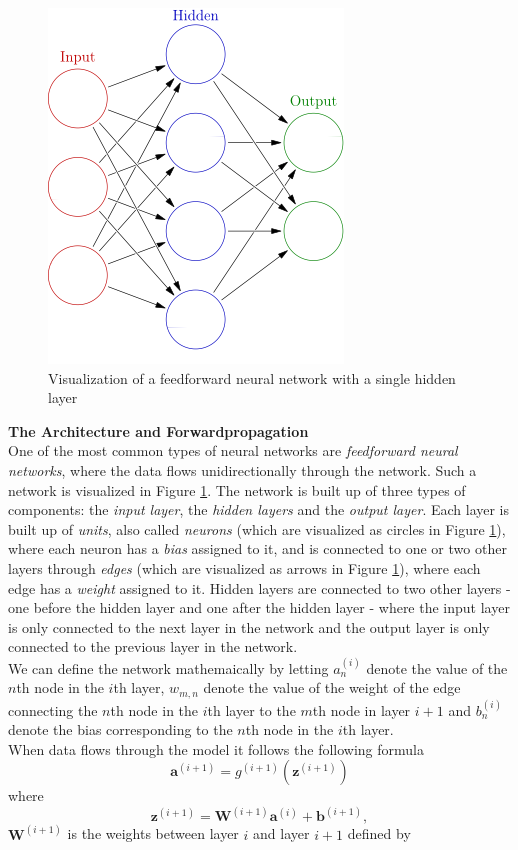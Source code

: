 \documentclass[./main.tex]{subfiles}
\begin{document}
\begin{figure}[H]
    \centering
    \includegraphics[height = 5 cm]{entities/feed_forward_nn.jpg}
    \caption{Visualization of a feedforward neural network with a single hidden layer \cite{feedforward_nn}}
    \label{feedforward_nn}
\end{figure}
\noindent \textbf{The Architecture and Forwardpropagation} \\
One of the most common types of neural networks are \textit{feedforward neural networks}, where the data flows unidirectionally through the network. Such a network is visualized in Figure \ref{feedforward_nn}. The network is built up of three types of components: the \textit{input layer}, the \textit{hidden layers} and the \textit{output layer}. Each layer is built up of \textit{units}, also called \textit{neurons} (which are visualized as circles in Figure \ref{feedforward_nn}), where each neuron has a \textit{bias} assigned to it, and is connected to one or two other layers through \textit{edges} (which are visualized as arrows in Figure \ref{feedforward_nn}), where each edge has a \textit{weight} assigned to it. Hidden layers are connected to two other layers - one before the hidden layer and one after the hidden layer - where the input layer is only connected to the next layer in the network and the output layer is only connected to the previous layer in the network. \\
We can define the network mathemaically by letting $a_n ^{(i)}$ denote the value of the $n$th node in the $i$th layer, $w_{m, n}$ denote the value of the weight of the edge connecting the $n$th node in the $i$th layer to the $m$th node in layer $i + 1$ and $b_n ^{(i)}$ denote the bias corresponding to the $n$th node in the $i$th layer. \\
When data flows through the model it follows the following formula
$$\bm{a}^{(i + 1)} = g^{(i + 1)} \left( \bm{z}^{(i + 1)} \right)$$
where
$$\bm{z}^{(i + 1)} = \bm{W}^{(i + 1)} \bm{a}^{(i)} + \bm{b}^{(i + 1)},$$
$\bm{W}^{(i + 1)}$ is the weights between layer $i$ and layer $i + 1$ defined by
\end{document}
